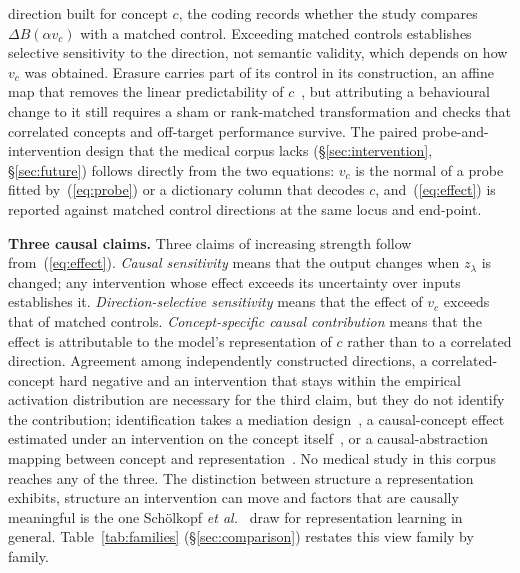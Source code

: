 direction built for concept $c$, the coding records whether the study compares $\Delta B(\alpha v_c)$
with a matched control. Exceeding matched controls establishes selective sensitivity to the direction,
not semantic validity, which depends on how $v_c$ was obtained. Erasure carries part of its control in
its construction, an affine map that removes the linear predictability of $c$~\cite{belrose2023leace},
but attributing a behavioural change to it still requires a sham or rank-matched transformation and
checks that correlated concepts and off-target performance survive. The paired probe-and-intervention
design that the medical corpus lacks (\S\ref{sec:intervention}, \S\ref{sec:future}) follows directly
from the two equations: $v_c$ is the normal of a probe fitted by~(\ref{eq:probe}) or a dictionary
column that decodes $c$, and~(\ref{eq:effect}) is reported against matched control directions at the
same locus and end-point.

\textbf{Three causal claims.} Three claims of increasing strength follow from~(\ref{eq:effect}).
\emph{Causal sensitivity} means that the output changes when $z_\lambda$ is changed; any intervention
whose effect exceeds its uncertainty over inputs establishes it. \emph{Direction-selective sensitivity}
means that the effect of $v_c$ exceeds that of matched controls. \emph{Concept-specific causal
contribution} means that the effect is attributable to the model's representation of $c$ rather than to
a correlated direction. Agreement among independently constructed directions, a correlated-concept hard
negative and an intervention that stays within the empirical activation distribution are necessary for
the third claim, but they do not identify the contribution; identification takes a mediation
design~\cite{pearl2001direct,imai2010mediation}, a causal-concept effect estimated under an
intervention on the concept itself~\cite{goyal2019cace}, or a causal-abstraction mapping between concept
and representation~\cite{geiger2021causal,geiger2023causal}. No medical study in this corpus reaches any
of the three. The distinction between structure a representation exhibits, structure an intervention
can move and factors that are causally meaningful is the one Sch\"olkopf \emph{et
al.}~\cite{scholkopf2021causal} draw for representation learning in general. Table~\ref{tab:families}
(\S\ref{sec:comparison}) restates this view family by family.

